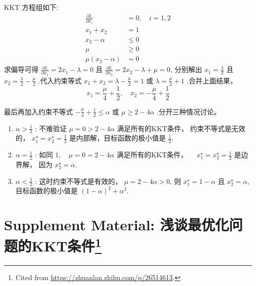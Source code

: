 KKT 方程组如下:
\begin{equation}
\begin{aligned}
\frac{\partial L}{\partial x_{i}} &=0, \quad i=1,2 \\
x_{1}+x_{2} &=1 \\
x_{2}-\alpha & \leq 0 \\
\mu & \geq 0 \\
\mu\left(x_{2}-\alpha\right) &=0
\end{aligned}
\end{equation}
求偏导可得 $ \frac{\partial L}{\partial x_{1}}=2 x_{1}-\lambda=0 $ 且 $ \frac{\partial L}{\partial x_{2}}=2 x_{2}-\lambda+\mu=0 $, 分别解出 $ x_{1}=\frac{\lambda}{2} $ 且 $ x_{2}=\frac{\lambda}{2}-\frac{\mu}{2} $ .代入约束等式 $ x_{1}+x_{2}=\lambda-\frac{\mu}{2}=1 $ 或 $ \lambda=\frac{\mu}{2}+1 $ .合并上面结果，
\begin{equation}
x_{1}=\frac{\mu}{4}+\frac{1}{2}, \quad x_{2}=-\frac{\mu}{4}+\frac{1}{2}
\end{equation}

最后再加入约束不等式 $ -\frac{\mu}{4}+\frac{1}{2} \leq \alpha $ 或 $ \mu \geq 2-4 \alpha $ .分开三种情况讨论。

\begin{enumerate}
    \item $ \alpha>\frac{1}{2} $ : 不难验证 $ \mu=0>2-4 \alpha $ 满足所有的KKT条件， 约束不等式是无效的， $ x_{1}^{\star}=x_{2}^{\star}=\frac{1}{2} $ 是内部解，目标函数的极小值是 $ \frac{1}{2}$.
    \item $ \alpha=\frac{1}{2} $ : 如同 $ 1, \quad \mu=0=2-4 \alpha $ 满足所有的KKT条件， $ \quad x_{1}^{\star}=x_{2}^{\star}=\frac{1}{2} $ 是边界解， 因为 $ x_{2}^{\star}=\alpha $.
    \item $ \alpha<\frac{1}{2} $ : 这时约束不等式是有效的， $ \mu=2-4 \alpha>0 $, 则 $ x_{1}^{\star}=1-\alpha $ 且 $ x_{2}^{\star}=\alpha $, 目标函数的极小值是 $ (1-\alpha)^{2}+\alpha^{2} $.
\end{enumerate}

\section[Supplement Material: 浅谈最优化问题的KKT条件]{Supplement Material: 浅谈最优化问题的KKT条件\footnote{Cited from \url{https://zhuanlan.zhihu.com/p/26514613}.}}


